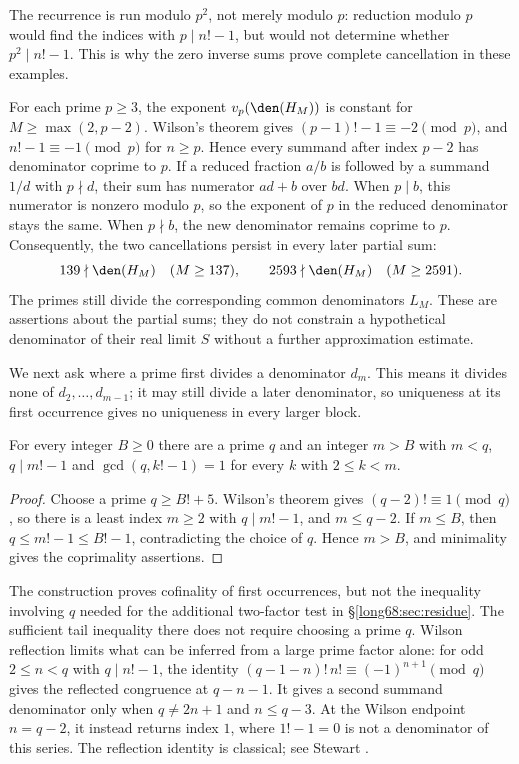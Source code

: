The recurrence is run modulo $p^2$, not merely modulo $p$: reduction
modulo $p$ would find the indices with $p\mid n!-1$, but would not
determine whether $p^2\mid n!-1$. This is why the zero inverse sums prove complete
cancellation in these examples.

For each prime $p\ge3$, the exponent $v_p(\den(H_M))$ is constant for
$M\ge\max(2,p-2)$. Wilson's theorem gives
$(p-1)!-1\equiv-2\pmod p$, and $n!-1\equiv-1\pmod p$ for $n\ge p$.
Hence every summand after index $p-2$ has denominator coprime to $p$. If a reduced fraction
$a/b$ is followed by a summand $1/d$ with $p\nmid d$, their sum has
numerator $ad+b$ over $bd$. When $p\mid b$, this numerator is nonzero
modulo $p$, so the exponent of $p$ in the reduced denominator stays the
same. When $p\nmid b$, the new denominator remains coprime to $p$.
Consequently, the two cancellations persist in every later partial sum:
\[
 139\nmid\den(H_M)\quad(M\ge137),\qquad
 2593\nmid\den(H_M)\quad(M\ge2591).
\]
The primes still divide the corresponding common denominators $L_M$.
These are assertions about the partial sums; they do not constrain a
hypothetical denominator of their real limit $S$ without a further
approximation estimate.

We next ask where a prime first divides a denominator $d_m$. This means
it divides none of $d_2,\ldots,d_{m-1}$; it may still divide a later
denominator, so uniqueness at its first occurrence gives no uniqueness
in every larger block.

\begin{proposition}\label{long68:res:wilson-cofinality}
For every integer $B\ge0$ there are a prime $q$ and an integer $m>B$ with
$m<q$, $q\mid m!-1$ and $\gcd(q,k!-1)=1$ for every $k$ with $2\le k<m$.
\end{proposition}

\begin{proof}
Choose a prime $q\ge B!+5$.  Wilson's theorem gives $(q-2)!\equiv1\pmod q$,
so there is a least index $m\ge2$ with $q\mid m!-1$, and $m\le q-2$.
If $m\le B$, then
$q\le m!-1\le B!-1$, contradicting the choice of $q$.  Hence $m>B$, and
minimality gives the coprimality assertions.
\end{proof}

The construction proves cofinality of first occurrences, but not the
inequality involving $q$ needed for the additional two-factor test in
\S\ref{long68:sec:residue}. The sufficient tail inequality there does not
require choosing a prime $q$. Wilson reflection limits what can be inferred
from a large prime factor alone: for odd $2\le n<q$ with $q\mid n!-1$,
the identity $(q-1-n)!\,n!\equiv(-1)^{n+1}\pmod q$ gives the reflected
congruence at $q-n-1$. It gives a second summand denominator only when
$q\ne2n+1$ and $n\le q-3$. At the Wilson endpoint $n=q-2$, it instead
returns index $1$, where $1!-1=0$ is not a denominator of this series.  The reflection identity is classical; see Stewart
\cite[p.~462, (4)]{stewart2004}.

